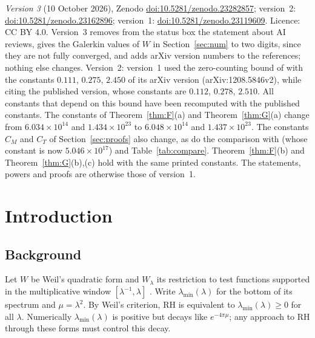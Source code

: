 \documentclass[11pt]{amsart}
\newcommand{\doi}[1]{\href{https://doi.org/#1}{doi:#1}}
\theoremstyle{remark}
\numberwithin{equation}{section}
\begin{document}
\begin{sloppypar}
\noindent\textit{Version 3} (10 October 2026), Zenodo \doi{10.5281/zenodo.23282857}; version~2: \doi{10.5281/zenodo.23162896}; version~1: \doi{10.5281/zenodo.23119609}. Licence: CC BY 4.0. Version~3 removes from the status box the statement about AI reviews, gives the Galerkin values of $W$ in Section~\ref{sec:num} to two digits, since they are not fully converged, and adds arXiv version numbers to the references; nothing else changes. Version~2: version~1 used the zero-counting bound of \cite{Trudgian14} with the constants $0.111$, $0.275$, $2.450$ of its arXiv version (arXiv:1208.5846v2), while citing the published version, whose constants are $0.112$, $0.278$, $2.510$. All constants that depend on this bound have been recomputed with the published constants. The constants of Theorem~\ref{thm:F}(a) and Theorem~\ref{thm:G}(a) change from $6.034\times10^{14}$ and $1.434\times10^{23}$ to $6.048\times10^{14}$ and $1.437\times10^{23}$. The constants $C_M$ and $C_T$ of Section~\ref{sec:proofs} also change, as do the comparison with \cite[Thm.~E]{MoriWeilII} (whose constant is now $5.046\times10^{17}$) and Table~\ref{tab:compare}. Theorem~\ref{thm:F}(b) and Theorem~\ref{thm:G}(b),(c) hold with the same printed constants. The statements, powers and proofs are otherwise those of version~1.
\end{sloppypar}


\begin{center}
\end{center}

\section{Introduction}

\subsection{Background}
Let $W$ be Weil's quadratic form and $W_\lambda$ its restriction to test functions supported in the multiplicative window $[\lambda^{-1},\lambda]$ \cite{CC21,CCM25}. Write $\lambda_{\min}(\lambda)$ for the bottom of its spectrum and $\mu=\lambda^2$. By Weil's criterion, RH is equivalent to $\lambda_{\min}(\lambda)\ge0$ for all $\lambda$. Numerically $\lambda_{\min}(\lambda)$ is positive but decays like $e^{-4\pi\mu}$; any approach to RH through these forms must control this decay.
\end{document}
